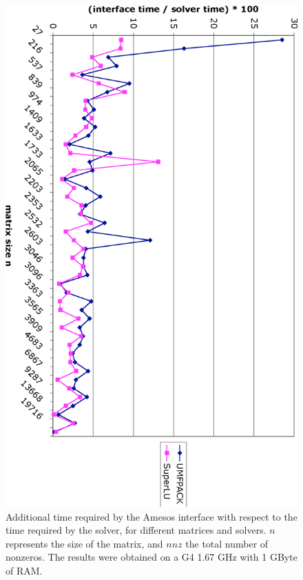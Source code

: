 \documentclass[acmtocl]{acmtrans2m}
\begin{document}
\begin{figure}
\begin{center}
\includegraphics[angle=90,width=13cm]{interface_time.eps}
\caption{Additional time required by the Amesos interface with respect to the
time required by the solver, for different matrices and solvers. $n$
  represents the size of the matrix, and $nnz$ the total number of nonzeros.
The results were obtained on a G4 1.67 GHz with 1 GByte of RAM.}
\label{fig:results}
\end{center}
\end{figure}

\end{document}
